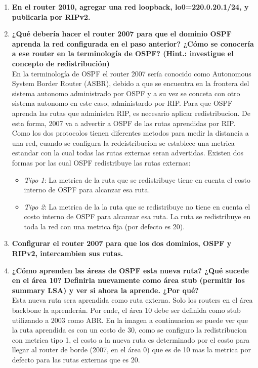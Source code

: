 \documentclass[letterpaper,12pt]{article}
\begin{document}
\begin{enumerate}
		\item \textbf{En el router 2010, agregar una red loopback, lo0=220.0.20.1/24, y publicarla por RIPv2.}
		
		\item \textbf{¿Qué debería hacer el router 2007 para que el dominio OSPF aprenda la red configurada en el paso anterior? ¿Cómo se conocería a ese router en la terminología de OSPF? (Hint.: investigue el concepto de redistribución)}\\
		En la terminología de OSPF el router 2007 sería conocido como Autonomous System Border Router (ASBR), debido a que se encuentra en la frontera del sistema autonomo administrado por OSPF y a su vez se conceta con otro sistema autonomo en este caso, administardo por RIP. Para que OSPF aprenda las rutas que administra RIP, es necesario aplicar redistribucion. De esta forma, 2007 va a advertir a OSPF de las rutas aprendidas por RIP. \\
		Como los dos protocolos tienen diferentes metodos para medir la distancia a una red, cuando se configura la redeistribucion se establece una metrica estandar con la cual todas las rutas externas seran advertidas. Existen dos formas por las cual OSPF redistribuye las rutas externas:
		\begin{itemize}
			\item \textit{Tipo 1}: La metrica de la ruta que se redistribuye tiene en cuenta el costo interno de OSPF para alcanzar esa ruta.
			\item \textit{Tipo 2}: La metrica de la la ruta que se redistribuye no tiene en cuenta el costo interno de OSPF para alcanzar esa ruta. La ruta se redistribuye en toda la red con una metrica fija (por defecto es 20).
		\end{itemize}
		
		\item \textbf{Configurar el router 2007 para que los dos dominios, OSPF y RIPv2, intercambien sus rutas.}
		
		\item \textbf{¿Cómo aprenden las áreas de OSPF esta nueva ruta? ¿Qué sucede en el área 10? Definirla nuevamente como área stub (permitir los summary LSA) y ver si ahora la aprende. ¿Por qué?}\\
		Esta nueva ruta sera aprendida como ruta externa. Solo los routers en el área backbone la aprenderán. Por ende, el área 10 debe ser definida como stub utilizando a 2003 como ABR. En la imagen a continuacion se puede ver que la ruta aprendida es con un costo de 30, como se configuro la redistribucion con metrica tipo 1, el costo a la nueva ruta es determinado por el costo para llegar al router de borde (2007, en el área 0) que es de 10 mas la metrica por defecto para las rutas externas que es 20.


\end{enumerate}
\end{document}
